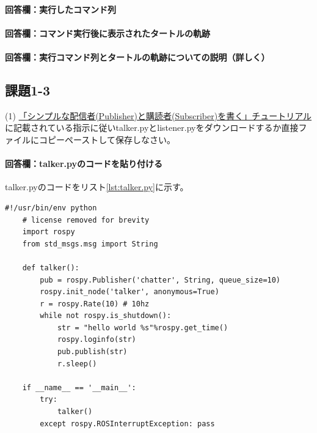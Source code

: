 \documentclass[12pt, xelatex,ja=standard,jafont=hiragino]{bxjsarticle}
\begin{document}
\paragraph{回答欄：実行したコマンド列}

\paragraph{回答欄：コマンド実行後に表示されたタートルの軌跡}

\paragraph{回答欄：実行コマンド列とタートルの軌跡についての説明（詳しく）}

\subsection{課題1-3}
\begin{itembox}[l]{(1)}
\href{https://wiki.ros.org/ja/ROS/Tutorials/WritingPublisherSubscriber%28python%29}{「シンプルな配信者(Publisher)と購読者(Subscriber)を書く」チュートリアル}に記載されている指示に従いtalker.pyとlistener.pyをダウンロードするか直接ファイルにコピーペーストして保存しなさい。
\end{itembox}

\paragraph{回答欄：talker.pyのコードを貼り付ける}
talker.pyのコードをリスト\ref{lst:talker.py}に示す。
\begin{lstlisting}[caption=talker.pyのコード,label=lst:talker.py]
    #!/usr/bin/env python
    # license removed for brevity
    import rospy
    from std_msgs.msg import String

    def talker():
        pub = rospy.Publisher('chatter', String, queue_size=10)
        rospy.init_node('talker', anonymous=True)
        r = rospy.Rate(10) # 10hz
        while not rospy.is_shutdown():
            str = "hello world %s"%rospy.get_time()
            rospy.loginfo(str)
            pub.publish(str)
            r.sleep()

    if __name__ == '__main__':
        try:
            talker()
        except rospy.ROSInterruptException: pass
\end{lstlisting}
\end{document}
